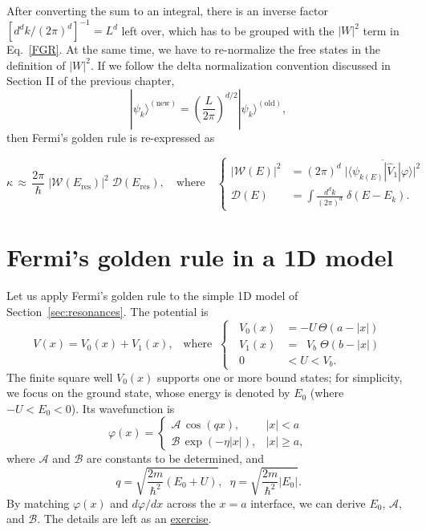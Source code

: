 \documentclass[pra,12pt]{revtex4}
\begin{document}
After converting the sum to an integral, there is an inverse factor
$\left[d^dk/(2\pi)^d\right]^{-1} = L^{d}$ left over, which has to be
grouped with the $|W|^2$ term in Eq.~\eqref{FGR}.  At the same time,
we have to re-normalize the free states in the definition of $|W|^2$.
If we follow the delta normalization convention discussed in Section
II of the previous chapter,
\begin{equation}
  |\psi_k\rangle^{(\textrm{new})}
  = \left(\frac{L}{2\pi}\right)^{d/2} |\psi_{k}\rangle^{(\textrm{old})},
\end{equation}
then Fermi's golden rule is re-expressed as
\begin{framed}
  \begin{equation}
    \kappa
    \,\approx\, \frac{2\pi}{\hbar} \;
    \big|\mathcal{W}(E_\mathrm{res})\big|^2 \; \mathcal{D}(E_{\mathrm{res}}),
    \quad \mathrm{where} \quad \left\{
    \begin{aligned}
      \big|\mathcal{W}(E)\big|^2
      &= (2\pi)^d \;
      \overline{\Big| \langle\psi_{k(E)}| \hat{V}_1|\varphi\rangle\Big|^2} \\
      \mathcal{D}(E) &= \int \frac{d^dk}{(2\pi)^d} \; \delta(E-E_k).
    \end{aligned}\right.
    \label{FGR2}
  \end{equation}
\end{framed}

\section{Fermi's golden rule in a 1D model}
\label{sec:fgr1d}

Let us apply Fermi's golden rule to the simple 1D model of
Section~\ref{sec:resonances}.  The potential is
\begin{equation}
  V(x) = V_0(x) + V_1(x), \;\;\;\mathrm{where}\;\;
  \left\{\;\;
  \begin{aligned}
    V_0(x) &= -U \, \Theta(a-|x|) \\
    V_1(x) &= \;\;V_b\; \Theta(b-|x|) \\
    0 &<U<V_b.
  \end{aligned}\right.
\end{equation}
The finite square well $V_0(x)$ supports one or more bound states; for
simplicity, we focus on the ground state, whose energy is denoted by
$E_0$ (where $-U < E_0 < 0$).  Its wavefunction is
\begin{equation}
  \varphi(x) = \begin{cases}\mathcal{A}\,\cos(qx), & |x| < a \\
    \mathcal{B} \, \exp\left(-\eta|x|\right), & |x| \ge a,\end{cases}
  \label{varphiansatz0}
\end{equation}
where $\mathcal{A}$ and $\mathcal{B}$ are constants to be determined,
and
\begin{equation}
  q = \sqrt{\frac{2m}{\hbar^2}(E_0+U)}, \;\; \eta = \sqrt{\frac{2m}{\hbar^2}|E_0|}.
\end{equation}
By matching $\varphi(x)$ and $d\varphi/dx$ across the $x=a$ interface,
we can derive $E_0$, $\mathcal{A}$, and $\mathcal{B}$.  The details
are left as an \hyperref[ex:1dfgr]{exercise}.
\end{document}
